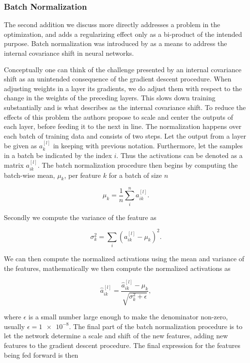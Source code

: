 \subsubsection{Batch Normalization}\label{sec:batchnorm}

The second addition we discuss more directly addresses a problem in the optimization, and adds a regularizing effect only as a bi-product of the intended purpose. Batch normalization was introduced by \citet{Ioffe2015} as a means to address the internal covariance shift in neural networks. 

Conceptually one can think of the challenge presented by an internal covariance shift as an unintended consequence of the gradient descent procedure. When adjusting weights in a layer its gradients, we do adjust them with respect to the change in the weights of the preceding layers. This slows down training substantially and is what \citet{Ioffe2015} describes as the internal covariance shift. To reduce the effects of this problem the authors propose to scale and center the outputs of each layer, before feeding it to the next in line. The normalization happens over each batch of training data and consists of two steps. Let the output from a layer be given as $a_k^{[l]}$ in keeping with previous notation. Furthermore, let the samples in a batch be indicated by the index $i$. Thus the activations can be denoted as a matrix $a_{ik}^{[l]}$. The batch normalization procedure then begins by computing the batch-wise mean, $\mu_k$, per feature $k$ for a batch of size $n$ 

\begin{equation}
\mu_k = \frac{1}{n} \sum_i^n a_{ik}^{[l]}.
\end{equation}

\noindent Secondly we compute the variance of the feature as 

\begin{equation}
\sigma_k^2= \sum_i (a^{[l]}_{ik} - \mu_k)^2.
\end{equation}

\noindent We can then compute the normalized activations using the mean and variance of the features, mathematically we then compute the normalized activations as 

\begin{equation}
\hat{a}_{ik}^{[l]} = \frac{\hat{a}_{ik}^{[l]} - \mu_k}{\sqrt{\sigma_k^2 + \epsilon}},
\end{equation}

\noindent where $\epsilon$ is a small number large enough to make the denominator non-zero, usually $\epsilon = \num{1e-8}$. The final part of the batch normalization procedure is to let the network determine a scale and shift of the new features, adding new features to the gradient descent procedure. The final expression for the features being fed forward is then 

